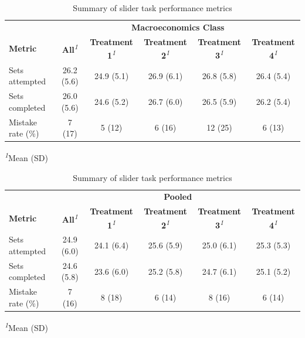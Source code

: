 \documentclass[
  12,
  letterpaper,
  DIV=11,
  numbers=noendperiod]{scrartcl}
\begin{document}
\begin{table}
{\fontsize{12.0pt}{14.4pt}\selectfont
\begin{tabular*}{\linewidth}{@{\extracolsep{\fill}}lccccc}
\toprule
 & \multicolumn{5}{c}{\textbf{Macroeconomics Class}} \\ 
\cmidrule(lr){2-6}
\textbf{Metric} & \textbf{All}\textsuperscript{\textit{1}} & \textbf{Treatment 1}\textsuperscript{\textit{1}} & \textbf{Treatment 2}\textsuperscript{\textit{1}} & \textbf{Treatment 3}\textsuperscript{\textit{1}} & \textbf{Treatment 4}\textsuperscript{\textit{1}} \\ 
\midrule\addlinespace[2.5pt]
Sets attempted & 26.2 (5.6) & 24.9 (5.1) & 26.9 (6.1) & 26.8 (5.8) & 26.4 (5.4) \\ 
Sets completed & 26.0 (5.6) & 24.6 (5.2) & 26.7 (6.0) & 26.5 (5.9) & 26.2 (5.4) \\ 
Mistake rate (\%) & 7 (17) & 5 (12) & 6 (16) & 12 (25) & 6 (13) \\ 
\bottomrule
\end{tabular*}
\begin{minipage}{\linewidth}
\textsuperscript{\textit{1}}Mean (SD)\\
\end{minipage}

\fontsize{12.0pt}{14.4pt}\selectfont
\begin{tabular*}{\linewidth}{@{\extracolsep{\fill}}lccccc}
\toprule
 & \multicolumn{5}{c}{\textbf{Pooled}} \\ 
\cmidrule(lr){2-6}
\textbf{Metric} & \textbf{All}\textsuperscript{\textit{1}} & \textbf{Treatment 1}\textsuperscript{\textit{1}} & \textbf{Treatment 2}\textsuperscript{\textit{1}} & \textbf{Treatment 3}\textsuperscript{\textit{1}} & \textbf{Treatment 4}\textsuperscript{\textit{1}} \\ 
\midrule\addlinespace[2.5pt]
Sets attempted & 24.9 (6.0) & 24.1 (6.4) & 25.6 (5.9) & 25.0 (6.1) & 25.3 (5.3) \\ 
Sets completed & 24.6 (5.8) & 23.6 (6.0) & 25.2 (5.8) & 24.7 (6.1) & 25.1 (5.2) \\ 
Mistake rate (\%) & 7 (16) & 8 (18) & 6 (14) & 8 (16) & 6 (14) \\ 
\bottomrule
\end{tabular*}
\begin{minipage}{\linewidth}
\textsuperscript{\textit{1}}Mean (SD)\\
\end{minipage}

}

\caption{\label{tbl-slider-performance-sumstats}Summary of slider task
performance metrics}

\end{table}%
\end{document}
